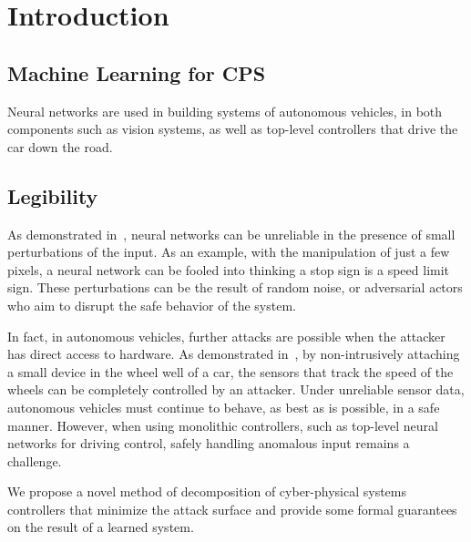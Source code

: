 \section{Introduction}

\subsection{Machine Learning for CPS}

Neural networks are used in building systems of autonomous vehicles, in both components such as vision systems, as well as top-level controllers that drive the car down the road.

\subsection{Legibility}

As demonstrated in~\cite{DBLP:journals/corr/SzegedyZSBEGF13}, neural networks can be unreliable in the presence of small perturbations of the input.
As an example, with the manipulation of just a few pixels, a neural network can be fooled into thinking a stop sign is a speed limit sign.
These perturbations can be the result of random noise, or adversarial actors who aim to disrupt the safe behavior of the system.

In fact, in autonomous vehicles, further attacks are possible when the attacker has direct access to hardware.
As demonstrated in~\cite{DBLP:journals/iacr/Shoukry0TS15}, by non-intrusively attaching a small device in the wheel well of a car, the sensors that track the speed of the wheels can be completely controlled by an attacker.
Under unreliable sensor data, autonomous vehicles must continue to behave, as best as is possible, in a safe manner.
However, when using monolithic controllers, such as top-level neural networks for driving control, safely handling anomalous input remains a challenge.

We propose a novel method of decomposition of cyber-physical systems controllers that minimize the attack surface and provide some formal guarantees on the result of a learned system.
